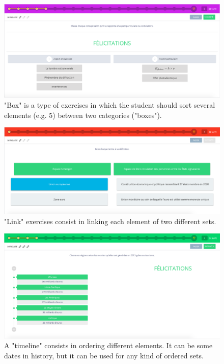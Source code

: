 \begin{figure}[!ht]
\centering
\includegraphics[clip, width= \textwidth]{2literature/fig/box.png}
\caption{"Box" is a type of exercises in which the student should sort several elements (e.g. 5) between two categories ("boxes").}
\label{fig:box}
\end{figure}

\begin{figure}[!ht]
\centering
\includegraphics[clip, width= \textwidth]{2literature/fig/link.png}
\caption{"Link" exercises consist in linking each element of two different sets.}
\label{fig:link}
\end{figure}

\begin{figure}[!ht]
\centering
\includegraphics[clip, width= \textwidth]{2literature/fig/timeline.png}
\caption{A "timeline" consists in ordering different elements. It can be some dates in history,  but it can be used for any kind of ordered sets.}
\label{fig:timeline}
\end{figure}

